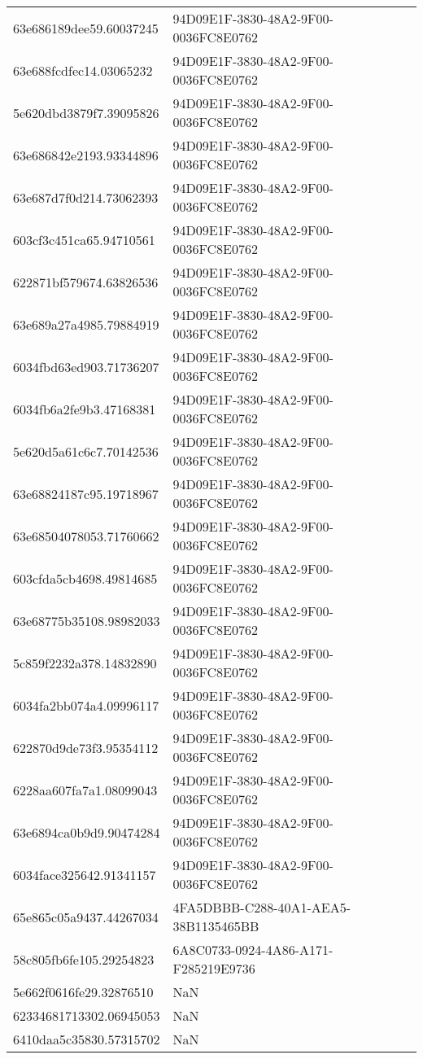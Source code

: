 \begin{tabular}{ll}
63e686189dee59.60037245 & 94D09E1F-3830-48A2-9F00-0036FC8E0762 \\
63e688fcdfec14.03065232 & 94D09E1F-3830-48A2-9F00-0036FC8E0762 \\
5e620dbd3879f7.39095826 & 94D09E1F-3830-48A2-9F00-0036FC8E0762 \\
63e686842e2193.93344896 & 94D09E1F-3830-48A2-9F00-0036FC8E0762 \\
63e687d7f0d214.73062393 & 94D09E1F-3830-48A2-9F00-0036FC8E0762 \\
603cf3c451ca65.94710561 & 94D09E1F-3830-48A2-9F00-0036FC8E0762 \\
622871bf579674.63826536 & 94D09E1F-3830-48A2-9F00-0036FC8E0762 \\
63e689a27a4985.79884919 & 94D09E1F-3830-48A2-9F00-0036FC8E0762 \\
6034fbd63ed903.71736207 & 94D09E1F-3830-48A2-9F00-0036FC8E0762 \\
6034fb6a2fe9b3.47168381 & 94D09E1F-3830-48A2-9F00-0036FC8E0762 \\
5e620d5a61c6c7.70142536 & 94D09E1F-3830-48A2-9F00-0036FC8E0762 \\
63e68824187c95.19718967 & 94D09E1F-3830-48A2-9F00-0036FC8E0762 \\
63e68504078053.71760662 & 94D09E1F-3830-48A2-9F00-0036FC8E0762 \\
603cfda5cb4698.49814685 & 94D09E1F-3830-48A2-9F00-0036FC8E0762 \\
63e68775b35108.98982033 & 94D09E1F-3830-48A2-9F00-0036FC8E0762 \\
5c859f2232a378.14832890 & 94D09E1F-3830-48A2-9F00-0036FC8E0762 \\
6034fa2bb074a4.09996117 & 94D09E1F-3830-48A2-9F00-0036FC8E0762 \\
622870d9de73f3.95354112 & 94D09E1F-3830-48A2-9F00-0036FC8E0762 \\
6228aa607fa7a1.08099043 & 94D09E1F-3830-48A2-9F00-0036FC8E0762 \\
63e6894ca0b9d9.90474284 & 94D09E1F-3830-48A2-9F00-0036FC8E0762 \\
6034face325642.91341157 & 94D09E1F-3830-48A2-9F00-0036FC8E0762 \\
65e865c05a9437.44267034 & 4FA5DBBB-C288-40A1-AEA5-38B1135465BB \\
58c805fb6fe105.29254823 & 6A8C0733-0924-4A86-A171-F285219E9736 \\
5e662f0616fe29.32876510 & NaN \\
62334681713302.06945053 & NaN \\
6410daa5c35830.57315702 & NaN \\

\end{tabular}
